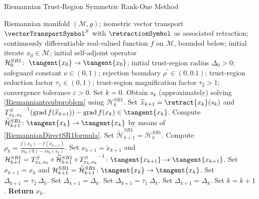 \begin{algorithm}[H]
    \caption{Riemannian Trust-Region Symmetric Rank-One Method}\label{RTR-SR1Method}
    \begin{algorithmic}[1]
        \State Riemannian manifold $(\mathcal{M}, g)$; isometric vector transport $\vectorTransportSymbol^S$ with $\retractionSymbol$ as associated retraction; continuously differentiable real-valued function $f$ on $\mathcal{M}$, bounded below; initial iterate $x_0 \in \mathcal{M}$; initial self-adjoint operator $\mathcal{H}^{SR1}_0 \colon \; \tangent{x_0} \to \tangent{x_0}$; initial trust-region radius $\Delta_0 > 0$; safeguard constant $\nu \in (0,1)$; rejection boundary $\rho^{\prime} \in (0, 0.1)$; trust-region reduction factor $\tau_1 \in (0,1)$; trust-region magnification factor $\tau_2 > 1$; convergence tolerance $\varepsilon > 0$. Set $k = 0$.
            \State Obtain $s_k$ (approximately) solving \cref{Riemanniantrsubproblem} using $\mathcal{H}^{SR1}_k$.
            \State Set $\widetilde{x}_{k+1} = \retract{x_k}(s_k)$ and ${T^{S}_{x_k, s_k}}^{-1} ( \operatorname{grad}f(\widetilde{x}_{k+1}) ) - \operatorname{grad}f(x_k) \in \tangent{x_k}$.
                \State Compute $\widetilde{\mathcal{H}}^{SR1}_{k+1} \colon \tangent{x_{k}} \to \tangent{x_{k}}$ by means of \cref{RiemannianDirectSR1formula}.
			\Else 
				\State Set $\widetilde{\mathcal{H}}^{SR1}_{k+1} = \mathcal{H}^{SR1}_k$.
            \EndIf 
            \State Compute $\rho_k = \frac{f(x_k) - f(\widetilde{x}_{k+1})}{m_k(0) - m_k(s_k)}$.
                \State Set $x_{k+1} = \widetilde{x}_{k+1}$ and $\mathcal{H}^{SR1}_{k+1} = T^{S}_{x_k, s_k} \circ \widetilde{\mathcal{H}}^{SR1}_{k+1} \circ  {T^{S}_{x_k, s_k}}^{-1} \colon \tangent{x_{k+1}} \to \tangent{x_{k+1}}$.
			\Else 
				\State Set $x_{k+1} = x_k$ and $\mathcal{H}^{SR1}_{k+1} = \widetilde{\mathcal{H}}^{SR1}_{k+1} \colon \tangent{x_{k}} \to \tangent{x_{k}}$.
            \EndIf 
                    \State Set $\Delta_{k+1} = \tau_2 \ \Delta_k$.
                \Else 
                    \State Set $\Delta_{k+1} = \Delta_k$.
                \EndIf 
			\Else 
                    \State Set $\Delta_{k+1} = \tau_1 \ \Delta_k$.
                \Else 
                    \State Set $\Delta_{k+1} = \Delta_k$.
                \EndIf 
            \EndIf 
            \State Set $k = k+1$.
        \EndWhile
        \State \textbf{Return} $x_k$.
    \end{algorithmic}
\end{algorithm}


